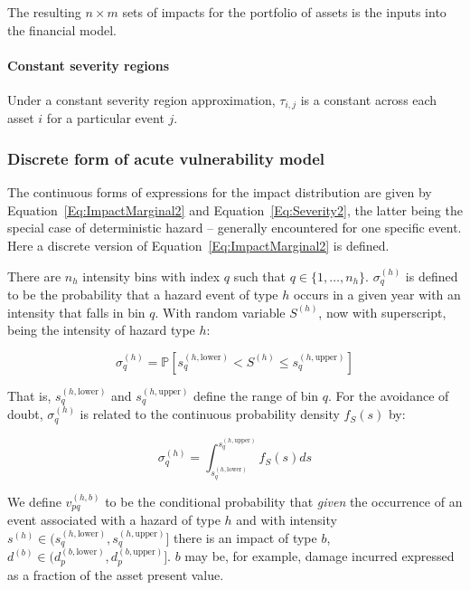 \documentclass[a4paper,11pt]{extarticle} %
\begin{document}
The resulting $n \times m$ sets of impacts for the portfolio of assets is the inputs into the financial model.

\paragraph{Constant severity regions}
Under a constant severity region approximation, $\tau_{i, j}$ is a constant across each asset $i$ for a particular event $j$.
 

\subsubsection{Discrete form of acute vulnerability model}
\label{Sec:MathematicalDescriptionOfAssetImpactModel}

The continuous forms of expressions for the impact distribution are given by Equation~\ref{Eq:ImpactMarginal2} and Equation~\ref{Eq:Severity2}, the latter being the special case of deterministic hazard -- generally encountered for one specific event. Here a discrete version of Equation~\ref{Eq:ImpactMarginal2} is defined.

There are $n_h$ intensity bins with index $q$ such that $q \in \{1, \dots, n_h \}$.  $\sigma^{(h)}_q$ is defined to be the probability that a hazard event of type $h$ occurs in a given year with an intensity that falls in bin $q$. With random variable $S^{(h)}$, now with superscript, being the intensity of hazard type $h$:

\begin{equation}
    \label{Eq:Discrete1}
    \sigma^{(h)}_q = \mathbb{P} \left[ s^{(h, \text{lower})}_q < S^{(h)} \le s^{(h, \text{upper})}_q \right]
\end{equation}

That is, $s^{(h, \text{lower})}_q$ and $s^{(h, \text{upper})}_q$ define the range of bin $q$. For the avoidance of doubt, $\sigma^{(h)}_q$ is related to the continuous probability density $f_S(s)$ by:

\begin{equation}
	\label{Eq:Discrete2}
	\sigma^{(h)}_q = \int_ {s^{(h, \text{lower})}_q}^{s^{(h, \text{upper})}_q} f_S(s) ds 
\end{equation}

We define $v^{(h, b)}_{pq}$ to be the conditional probability that \emph{given} the occurrence of an event associated with a hazard of type $h$ and with intensity $s^{(h)} \in (s^{(h, \text{lower})}_q, s^{(h, \text{upper})}_q]$ there is an impact of type $b$, $d^{(b)} \in (d^{(b,\text{lower})}_p, d^{(b,\text{upper})}_p]$. $b$ may be, for example, damage incurred expressed as a fraction of the asset present value. 
\end{document}
